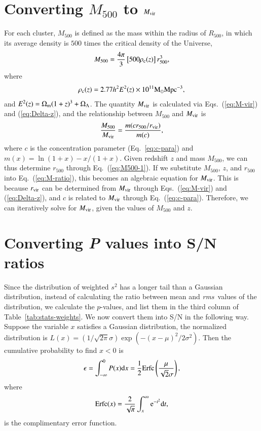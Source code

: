 \documentclass[traditabstract, longauth]{aa}
\newcommand{\1}{\'\i }
\def \der {{\rm d}}
\def \rms{{\it rms}}
\begin{document}
\section{Converting {\boldmath $M_{500}$} to {\boldmath $M_{\rm vir}$}}
\label{sec:m500-mvir}

For each cluster, $M_{500}$ is defined as the mass within the radius of
$R_{500}$, in which its average density is $500$ times the critical density of
the Universe,
\begin{eqnarray}
M_{500}=\frac{4\pi}{3}\left[500 \rho_{\rm c}(z)
\right]r^{3}_{500}, \label{eq:M500-1}
\end{eqnarray}
where
\begin{eqnarray}
\rho_{\rm c}(z)=2.77h^2E^2(z) \times 10^{11}{\rm M}_{\odot}{\rm Mpc}^{-3},
\end{eqnarray}
and $E^{2}(z)=\Omega_{\rm m}(1+z)^{3}+\Omega_{\rm \Lambda}$.
The quantity
$M_{\rm vir}$ is calculated via Eqs.~(\ref{eq:M-vir}) and (\ref{eq:Delta-z}),
and the relationship between $M_{500}$ and $M_{\rm vir}$ is \citep{Mody12}
\begin{eqnarray}
\frac{M_{500}}{M_{\rm vir}}=\frac{m(cr_{500}/r_{\rm vir})}{m(c)}, \label{eq:M-ratio}
\end{eqnarray}
where $c$ is the concentration parameter (Eq.~\eqref{eq:c-para}) and
$m(x)=\ln(1+x)-x/(1+x)$.
Given redshift $z$ and mass $M_{500}$, we can thus determine $r_{500}$ through
Eq.~(\ref{eq:M500-1}). If we substitute $M_{500}$, $z$, and $r_{500}$ into
Eq.~(\ref{eq:M-ratio}), this becomes an algebraic equation for $M_{\rm vir}$.
This is because $r_{\rm vir}$ can be determined from $M_{\rm vir}$ through
Eqs.~(\ref{eq:M-vir}) and (\ref{eq:Delta-z}), and $c$ is related to
$M_{\rm vir}$ through Eq.~(\ref{eq:c-para}). Therefore, we can iteratively
solve for $M_{\rm vir}$, given the values of $M_{500}$ and $z$.

\section{Converting \textit{P} values into S/N ratios}
\label{sec:P-SN}

Since the distribution of weighted $s^{2}$ has a longer tail than a Gaussian
distribution, instead of calculating the ratio between mean and \rms\ values
of the distribution, we calculate the $p$-values, and list them in the third
column of Table~\ref{tab:stats-weights}. We now convert them into
S/N in the following way.  Suppose the variable $x$ satisfies a Gaussian
distribution, the normalized distribution is
$L(x)=(1/\sqrt{2\pi}\sigma)\exp(-(x-\mu)^{2}/2\sigma^{2})$. Then the cumulative
probability to find $x<0$ is
\begin{eqnarray}
\epsilon=\int^{0}_{-\infty}P(x)\der x =\frac{1}{2}{\rm Erfc}\left(\frac{\mu}{\sqrt{2}\sigma} \right),
\end{eqnarray}
where
\begin{eqnarray}
{\rm Erfc}(x)=\frac{2}{\sqrt{\pi}}\int^{\infty}_{x}{\rm e}^{-t^{2}}\der t,
\end{eqnarray}
is the complimentary error function.
\end{document}
